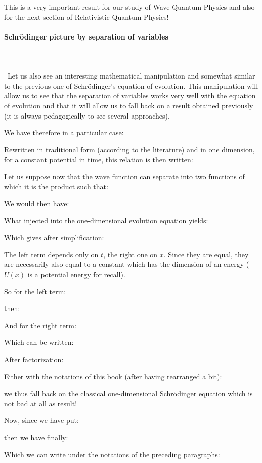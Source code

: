 	This is a very important result for our study of Wave Quantum Physics and also for the next section of Relativistic Quantum Physics!
	
	\paragraph{Schrödinger picture by separation of variables}\mbox{}\\\\\
	Let us also see an interesting mathematical manipulation and somewhat similar to the previous one of Schrödinger's equation of evolution. This manipulation will allow us to see that the separation of variables works very well with the equation of evolution and that it will allow us to fall back on a result obtained previously (it is always pedagogically to see several approaches).

We have therefore in a particular case:
	
	Rewritten in traditional form (according to the literature) and in one dimension, for a constant potential in time, this relation is then written:
	
	Let us suppose now that the wave function can separate into two functions of which it is the product such that:
	
	We would then have:
	
	What injected into the one-dimensional evolution equation yields:
	
	Which gives after simplification:
	
	The left term depends only on $t$, the right one on $x$. Since they are equal, they are necessarily also equal to a constant which has the dimension of an energy ($U(x)$ is a potential energy for recall).

	So for the left term:
	
	then:
	
	And for the right term:
	
	Which can be written:
	
	After factorization:
	
	Either with the notations of this book (after having rearranged a bit):
	
	we thus fall back on the classical one-dimensional Schrödinger  equation which is not bad at all as result!

	Now, since we have put:
	
		then we have finally:
	
	Which we can write under the notations of the preceding paragraphs:
	
